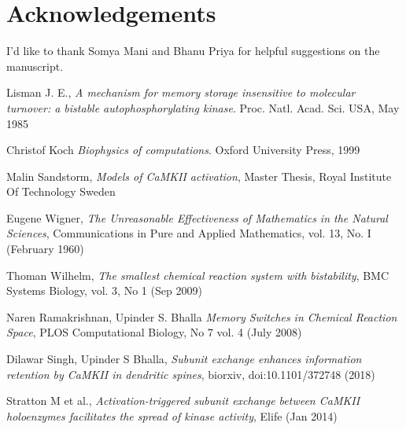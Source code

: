 \documentclass[]{resonance}
\begin{document}
\section*{Acknowledgements} I'd like to thank Somya Mani and Bhanu Priya for
helpful suggestions on the manuscript.


\begin{thebibliography}{99} 
    Lisman J. E., 
    \textit{A mechanism for memory storage insensitive to molecular turnover: a
    bistable autophosphorylating kinase}. 
    Proc. Natl. Acad. Sci. USA, May 1985

    Christof Koch
    \textit{Biophysics of computations}.
    Oxford University Press, 1999

    Malin Sandstorm,
    \textit{Models of CaMKII activation},
    Master Thesis, Royal Institute Of Technology Sweden 

    Eugene Wigner,
    \textit{The Unreasonable Effectiveness of Mathematics in the Natural Sciences},
     Communications in Pure and Applied Mathematics, vol. 13, No. I (February 1960)

    Thoman Wilhelm,
    \textit{The smallest chemical reaction system with bistability},
    BMC Systems Biology, vol. 3, No 1 (Sep 2009)

    Naren Ramakrishnan, Upinder S. Bhalla
    \textit{Memory Switches in Chemical Reaction Space},
    PLOS Computational Biology, No 7 vol. 4 (July 2008)

    Dilawar Singh, Upinder S Bhalla,
    \textit{Subunit exchange enhances information retention by CaMKII in dendritic spines},
    biorxiv, doi:10.1101/372748 (2018)

    Stratton M et al.,
    \textit{Activation-triggered subunit exchange between CaMKII holoenzymes
    facilitates the spread of kinase activity}, Elife (Jan 2014) 

\end{thebibliography}
\end{document}
